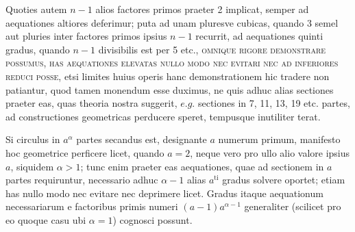 Quoties autem \(n-1\) alios factores primos praeter 2 implicat, semper ad aequationes altiores deferimur; puta ad unam pluresve cubicas, quando 3 semel aut pluries inter factores primos ipsius \(n-1\) recurrit, ad aequationes quinti gradus, quando \(n-1\) divisibilis est per 5 etc., \textsc{omnique rigore demonstrare possumus, has aequationes elevatas nullo modo nec evitari nec ad inferiores reduci posse,} etsi limites huius operis hanc demonstrationem hic tradere non patiantur, quod tamen monendum esse duximus, ne quis adhuc alias sectiones praeter eas, quas theoria nostra suggerit, \(e.g.\) sectiones in 7, 11, 13, 19 etc. partes, ad constructiones geometricas perducere speret, tempusque inutiliter terat.


Si circulus in \(a^\alpha\) partes secandus est, designante \(a\) numerum primum, manifesto hoc geometrice perficere licet, quando \(a=2\), neque vero pro ullo alio valore ipsius \(a\), siquidem \(\alpha>1\); tunc enim praeter eas aequationes, quae ad sectionem in \(a\) partes requiruntur, necessario adhuc \(\alpha-1\) alias \(a^{\mathrm{ti}}\) gradus solvere oportet; etiam has nullo modo nec evitare nec deprimere licet. Gradus itaque aequationum necessariarum e factoribus primis numeri \((a-1)a^{\alpha-1}\) generaliter (scilicet pro eo quoque casu ubi \(\alpha=1\)) cognosci possunt.

